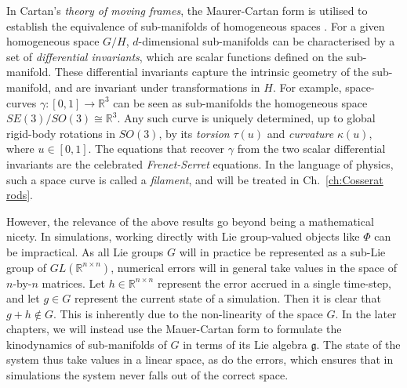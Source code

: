 In Cartan's \textit{theory of moving frames}, the Maurer-Cartan form is utilised to establish the equivalence of sub-manifolds of homogeneous spaces \citep{levyReviewElieCartan1935, clellandFrenetCartanMethod2017, olverSurveyMovingFrames2005, gardnerMethodEquivalenceIts1989}. For a given homogeneous space $G/H$, $d$-dimensional sub-manifolds can be characterised by a set of \textit{differential invariants}, which are scalar functions defined on the sub-manifold. These differential invariants capture the intrinsic geometry of the sub-manifold, and are invariant under transformations in $H$.  For example, space-curves $\gamma : [0,1] \to \mathbb{R}^3$ can be seen as sub-manifolds the homogeneous space $SE(3) / SO(3) \cong \mathbb{R}^3$. Any such curve is uniquely determined, up to global rigid-body rotations in $SO(3)$, by its \textit{torsion} $\tau(u)$ and \textit{curvature} $\kappa(u)$, where $u \in [0,1]$. The equations that recover $\gamma$ from the two scalar differential invariants are the celebrated \textit{Frenet-Serret} equations. In the language of physics, such a space curve is called a \textit{filament}, and will be treated in Ch.~\ref{ch:Cosserat rods}.

However, the relevance of the above results go beyond being a mathematical nicety. In simulations, working directly with Lie group-valued objects like $\Phi$ can be impractical. As all Lie groups $G$ will in practice be represented as a sub-Lie group of $GL(\mathbb{R}^{n \times n})$, numerical errors will in general take values in the space of $n$-by-$n$ matrices. Let $h \in \mathbb{R}^{n \times n}$ represent the error accrued in a single time-step, and let $g \in G$ represent the current state of a simulation. Then it is clear that $g + h \not\in G$. This is inherently due to the non-linearity of the space $G$. In the later chapters, we will instead use the Mauer-Cartan form to formulate the kinodynamics of sub-manifolds of $G$ in terms of its Lie algebra $\mathfrak{g}$. The state of the system thus take values in a linear space, as do the errors, which ensures that in simulations the system never falls out of the correct space.


